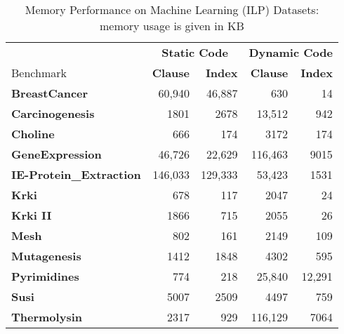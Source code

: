 \documentclass{llncs}
\newcommand{\bench}[1]{\textbf{\textsf{#1}}}
\newcommand{\BreastCancer}{\bench{BreastCancer}\xspace}
\newcommand{\Carcinogenesis}{\bench{Carcinogenesis}\xspace}
\newcommand{\Choline}{\bench{Choline}\xspace}
\newcommand{\GeneExpression}{\bench{GeneExpression}\xspace}
\begin{document}
\begin{table*}[ht]
  \centering
  \caption{Memory Performance on Machine Learning (ILP) Datasets: memory
    usage is given in KB}
  \label{tab:ilp:memory}
  \setlength{\tabcolsep}{3pt}
  \begin {tabular}{|l|r|r||r|r|} \hline %
    &  \multicolumn{2}{|c||}{\bf Static Code}  & \multicolumn{2}{|c|}{\bf Dynamic Code} \\
    Benchmark   &  \textbf{Clause} & {\bf Index}  & \textbf{Clause} & {\bf Index} \\
    \hline
    \BreastCancer
    & 60,940 & 46,887 
    & 630  & 14
    \\

    \Carcinogenesis
    & 1801 & 2678
    & 13,512 & 942
    \\

    \Choline  & 666 & 174
    & 3172 & 174
    \\

    \GeneExpression
    &  46,726 & 22,629
    & 116,463 & 9015
    \\

    \bench{IE-Protein\_Extraction}
    & 146,033 & 129,333
    & 53,423 & 1531
    \\

    \bench{Krki}              & 678 & 117
    & 2047 & 24
    \\

    \bench{Krki II}           & 1866 & 715
    & 2055 & 26
    \\

    \bench{Mesh}              & 802 & 161
    & 2149 & 109
    \\
    
    \bench{Mutagenesis}       & 1412 & 1848
    & 4302 & 595
    \\
    
    \bench{Pyrimidines}       & 774 & 218
    & 25,840 & 12,291
    \\

    \bench{Susi}              & 5007 & 2509
    & 4497 & 759
    \\

    \bench{Thermolysin}       & 2317 & 929
    & 116,129 & 7064
    \\
    \hline
\end{tabular}
\end{table*}
\end{document}
